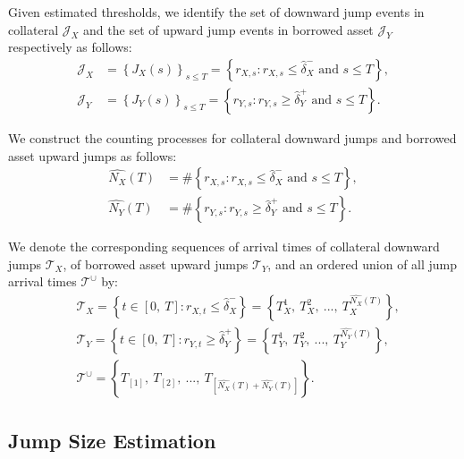 \documentclass{article}
\theoremstyle{definition}
\begin{document}
Given estimated thresholds, we identify the set of downward jump events in collateral $\mathcal{J}_X$ and the set of upward jump events in borrowed asset $\mathcal{J}_Y$ respectively as follows:
\begin{equation}
   \begin{split}
   \mathcal{J}_X &= \left\{J_X(s)\right\}_{s \leq T} = \left\{
     r_{X,s}: r_{X,s} \leq \widehat\delta_X^- \text{ and } s \leq T
     \right\},\\
     \mathcal{J}_Y &= \left\{J_Y(s)\right\}_{s \leq T} = \left\{
       r_{Y,s}: r_{Y,s} \geq \widehat\delta_Y^+ \text{ and } s \leq T
       \right\}.
   \end{split}
\end{equation}

We construct the counting processes for collateral downward jumps and borrowed asset upward jumps as follows:
\begin{equation}
   \begin{split}
   \widehat{N_X}(T) &= \#\left\{
       r_{X,s}: r_{X,s} \leq \widehat\delta_X^- \text{ and } s \leq T
       \right\}, \\ 
   \widehat{N_Y}(T) &= \#\left\{
       r_{Y,s}: r_{Y,s} \geq \widehat\delta_Y^+ \text{ and } s \leq T
       \right\}.
   \end{split}
\end{equation}

We denote the corresponding sequences of arrival times of collateral downward jumps $\mathcal{T}_X$, of borrowed asset upward jumps $\mathcal{T}_Y$, and an ordered union of all jump arrival times $\mathcal{T}^{\cup}$ by:
\begin{equation}
   \begin{split}
& \mathcal{T}_X = \left\{t \in [0,\ T]: r_{X,t} \leq \widehat\delta_X^- \right\} = \left\{T_X^1,\ T_X^2,\ ...,\ T_X^{\widehat{N_X}(T)}\right\},\\
& \mathcal{T}_Y = \left\{t \in [0,\ T]: r_{Y,t} \geq \widehat\delta_Y^+ \right\} = \left\{T_Y^1,\ T_Y^2,\ ...,\ T_Y^{\widehat{N_Y}(T)}\right\},\\
& \mathcal{T}^{\cup} = \left\{T_{[1]},\ T_{[2]},\ ...,\ T_{[\widehat{N_X}(T)+\widehat{N_Y}(T)]}\right\}.
   \end{split}
\end{equation}

\subsection{Jump Size Estimation}
\end{document}
